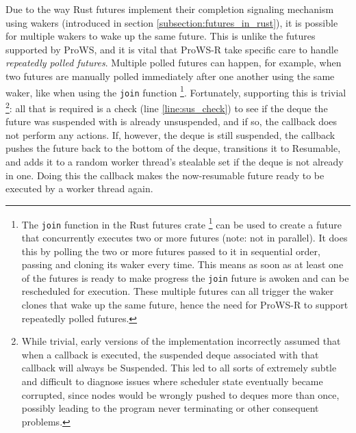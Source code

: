 \documentclass[bsc,frontabs,singlespacing,parskip,deptreport,normalheadings]{infthesis}
\begin{document}
Due to the way Rust futures implement their completion signaling mechanism using
wakers (introduced in section \ref{subsection:futures_in_rust}), it is possible
for multiple wakers to wake up the same future. This is unlike the futures
supported by ProWS, and it is vital that ProWS-R take specific care to handle
\textit{repeatedly polled futures}. Multiple polled futures can happen, for
example, when two futures are manually polled immediately after one another
using the same waker, like when using the \texttt{join} function \footnote{The
    \texttt{join} function in the Rust futures crate \footnote{Crates in Rust
    are essentially synonymous to packages or libraries in other languages.}
    \cite{noauthor_join_nodate} can be used to create a future that concurrently
    executes two or more futures (note: not in parallel). It does this by
    polling the two or more futures passed to it in sequential order, passing
    and cloning its waker every time. This means as soon as at least one of the
    futures is ready to make progress the \texttt{join} future is awoken and can
    be rescheduled for execution. These multiple futures can all trigger the
    waker clones that wake up the same future, hence the need for ProWS-R to
    support repeatedly polled futures.}. Fortunately, supporting this is trivial
    \footnote{While trivial, early versions of the implementation incorrectly
        assumed that when a callback is executed, the suspended deque associated
        with that callback will always be Suspended. This led to all sorts of
        extremely subtle and difficult to diagnose issues where scheduler state
        eventually became corrupted, since nodes would be wrongly pushed to
    deques more than once, possibly leading to the program never terminating or
other consequent problems.}: all that is required is a check (line
\ref{line:sus_check}) to see if the deque the future was suspended with is
already unsuspended, and if so, the callback does not perform any actions. If,
however, the deque is still suspended, the callback pushes the future back to
the bottom of the deque, transitions it to Resumable, and adds it to a random
worker thread's stealable set if the deque is not already in one. Doing this the
callback makes the now-resumable future ready to be executed by a worker thread
again.
\end{document}
